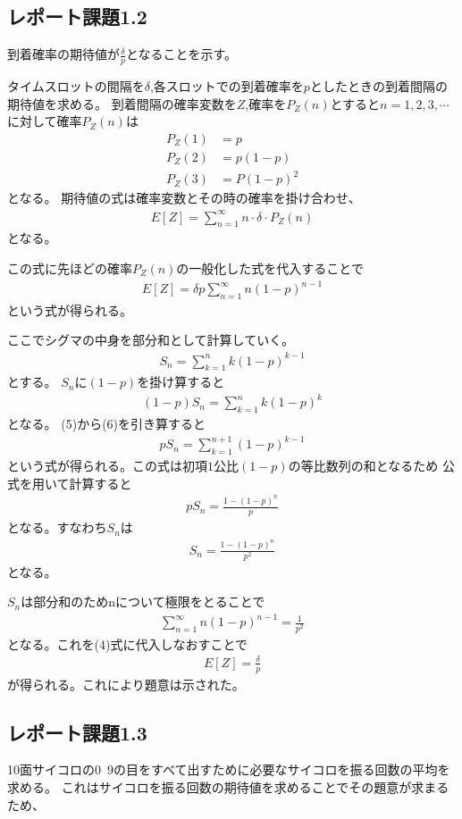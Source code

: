 \documentclass[a4paper,11pt,dvipdfmx]{jsarticle}
\begin{document}
\subsection*{レポート課題1.2}
到着確率の期待値が$\frac{\delta}{p}$となることを示す。

タイムスロットの間隔を$\delta$,各スロットでの到着確率を$p$としたときの到着間隔の期待値を求める。
到着間隔の確率変数を$Z$,確率を$P_Z(n)$とすると$n=1,2,3,\cdots$に対して確率$P_Z(n)$は
\begin{equation}
    \begin{split}
        P_Z(1) &= p \\
        P_Z(2) &= p(1-p) \\
        P_Z(3) &= P(1-p)^2 
    \end{split}
\end{equation}
となる。
期待値の式は確率変数とその時の確率を掛け合わせ、
\begin{align}
    E[Z] = \sum_{n=1}^{\infty}n \cdot \delta \cdot P_Z(n) 
\end{align}
となる。

この式に先ほどの確率$P_Z(n)$の一般化した式を代入することで
\begin{align}
    E[Z] = \delta p\sum_{n=1}^{\infty}n(1-p)^{n-1}
\end{align}
という式が得られる。

ここでシグマの中身を部分和として計算していく。
\begin{align}
    S_n = \sum_{k=1}^{n}k(1-p)^{k-1}
\end{align}
とする。
$S_n$に$(1-p)$を掛け算すると
\begin{align}
    (1-p)S_n = \sum_{k=1}^{n}k(1-p)^k
\end{align}
となる。
(5)から(6)を引き算すると
\begin{align}
    pS_n = \sum_{k=1}^{n+1}(1-p)^{k-1}
\end{align}
という式が得られる。この式は初項$1$公比$(1-p)$の等比数列の和となるため
公式を用いて計算すると
\begin{align}
    pS_n = \frac{1-(1-p)^n}{p}
\end{align}
となる。すなわち$S_n$は
\begin{align}
    S_n = \frac{1-(1-p)^n}{p^2}
\end{align}
となる。

$S_n$は部分和のためnについて極限をとることで
\begin{align}
    \sum_{n=1}^{\infty}n(1-p)^{n-1} = \frac{1}{p^2}
\end{align}
となる。これを(4)式に代入しなおすことで
\begin{align}
    E[Z] = \frac{\delta}{p}
\end{align}
が得られる。これにより題意は示された。

\subsection*{レポート課題1.3}
10面サイコロの0~9の目をすべて出すために必要なサイコロを振る回数の平均を求める。
これはサイコロを振る回数の期待値を求めることでその題意が求まるため、
\end{document}
